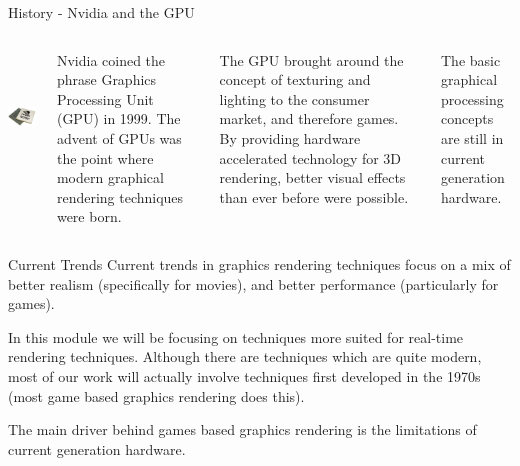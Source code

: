 \documentclass[handout,18pt]{beamer}
\begin{document}
\begin{frame}{History - Nvidia and the GPU}
\begin{columns}
\includegraphics[height=3.5cm]{nvidia.jpg}

\vspace{10pt}
Nvidia coined the phrase Graphics Processing Unit (GPU) in 1999.  The advent of GPUs was the point where modern graphical rendering techniques were born.

\vspace{11pt}
The GPU brought around the concept of texturing and lighting to the consumer market, and therefore games.  By providing hardware accelerated technology for 3D rendering, better visual effects than ever before were possible.

\vspace{11pt}
The basic graphical processing concepts are still in current generation hardware.
\end{columns}
\end{frame}

\begin{frame}{Current Trends}
\pause
Current trends in graphics rendering techniques focus on a mix of better realism (specifically for movies), and better performance (particularly for games).
\pause

\vspace{11pt}
In this module we will be focusing on techniques more suited for real-time rendering techniques.  Although there are techniques which are quite modern, most of our work will actually involve techniques first developed in the 1970s (most game based graphics rendering does this).
\pause

\vspace{11pt}
The main driver behind games based graphics rendering is the limitations of current generation hardware.
\end{frame}
\end{document}
